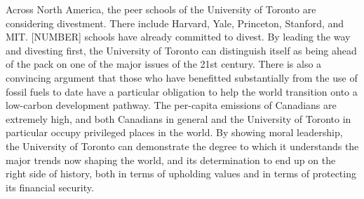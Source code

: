 Across North America, the peer schools of the University of Toronto are considering divestment.
There include Harvard, Yale, Princeton, Stanford, and MIT.
[NUMBER] schools have already committed to divest.
By leading the way and divesting first, the University of Toronto can distinguish itself as being ahead of the pack on one of the major issues of the 21st century.
There is also a convincing argument that those who have benefitted substantially from the use of fossil fuels to date have a particular obligation to help the world transition onto a low-carbon development pathway.
The per-capita emissions of Canadians are extremely high, and both Canadians in general and the University of Toronto in particular occupy privileged places in the world.
By showing moral leadership, the University of Toronto can demonstrate the degree to which it understands the major trends now shaping the world, and its determination to end up on the right side of history, both in terms of upholding values and in terms of protecting its financial security.


